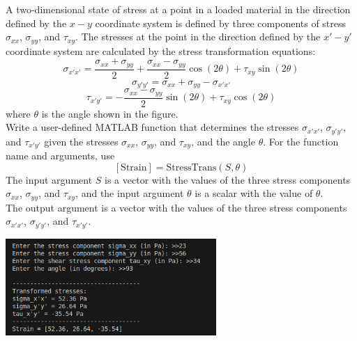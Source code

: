 \documentclass[a4paper, 12pt]{report}
\def\ni{blue!20!white}
\def\link{blue!50!black}
\begin{document}
    \begin{tcolorbox}[title={\color{black}{\section{Q11}}}, colback=white, colframe=\ni, boxrule=1mm, width=1\textwidth]    
        A two-dimensional state of stress at a point in a loaded material in the direction defined by the \( x - y \) coordinate system is defined by three components of stress \( \sigma_{xx} \), \( \sigma_{yy} \), and \( \tau_{xy} \). The stresses at the point in the direction defined by the \( x' - y' \) coordinate system are calculated by the stress transformation equations:
        \[\sigma_{x' x'} = \frac{\sigma_{xx} + \sigma_{yy}}{2} + \frac{\sigma_{xx} - \sigma_{yy}}{2} \cos(2\theta) + \tau_{xy} \sin(2\theta)\]
        \[\sigma_{y' y'} = \sigma_{xx} + \sigma_{yy} - \sigma_{x'x'}\]
        \[\tau_{x' y'} = -\frac{\sigma_{xx} - \sigma_{yy}}{2} \sin(2\theta) + \tau_{xy} \cos(2\theta)\]
        where \( \theta \) is the angle shown in the figure.\\[8pt]
        Write a user-defined MATLAB function that determines the stresses \( \sigma_{x' x'} \), \( \sigma_{y' y'} \), and \( \tau_{x' y'} \) given the stresses \( \sigma_{xx} \), \( \sigma_{yy} \), and \( \tau_{xy} \), and the angle \( \theta \). For the function name and arguments, use 
        \[[\text{Strain}] = \text{StressTrans}(S, \theta)\]
        The input argument \( S \) is a vector with the values of the three stress components \( \sigma_{xx} \), \( \sigma_{yy} \), and \( \tau_{xy} \), and the input argument \( \theta \) is a scalar with the value of \( \theta \).\\[8pt]
        The output argument  is a vector with the values of the three stress components \( \sigma_{x' x'} \), \( \sigma_{y' y'} \), and \( \tau_{x' y'} \).
   \end{tcolorbox}
   
    
    \includegraphics[width=0.6\textwidth]{images/q11.png}
\end{document}
